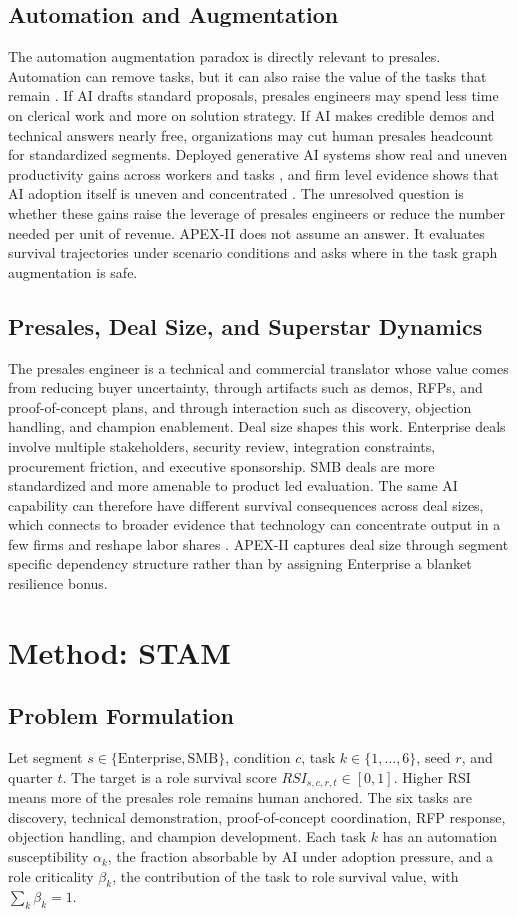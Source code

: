 \documentclass[10pt,conference]{IEEEtran}
\begin{document}
\subsection{Automation and Augmentation}
The automation augmentation paradox is directly relevant to presales. Automation can remove tasks, but it can also raise the value of the tasks that remain \cite{raisch2021artificial}. If AI drafts standard proposals, presales engineers may spend less time on clerical work and more on solution strategy. If AI makes credible demos and technical answers nearly free, organizations may cut human presales headcount for standardized segments. Deployed generative AI systems show real and uneven productivity gains across workers and tasks \cite{brynjolfsson2023generative}, and firm level evidence shows that AI adoption itself is uneven and concentrated \cite{mcelheran2024adoption}. The unresolved question is whether these gains raise the leverage of presales engineers or reduce the number needed per unit of revenue. APEX-II does not assume an answer. It evaluates survival trajectories under scenario conditions and asks where in the task graph augmentation is safe.

\subsection{Presales, Deal Size, and Superstar Dynamics}
The presales engineer is a technical and commercial translator whose value comes from reducing buyer uncertainty, through artifacts such as demos, RFPs, and proof-of-concept plans, and through interaction such as discovery, objection handling, and champion enablement. Deal size shapes this work. Enterprise deals involve multiple stakeholders, security review, integration constraints, procurement friction, and executive sponsorship. SMB deals are more standardized and more amenable to product led evaluation. The same AI capability can therefore have different survival consequences across deal sizes, which connects to broader evidence that technology can concentrate output in a few firms and reshape labor shares \cite{autor2020fall}. APEX-II captures deal size through segment specific dependency structure rather than by assigning Enterprise a blanket resilience bonus.

\section{Method: STAM}
\subsection{Problem Formulation}
Let segment $s \in \{\mathrm{Enterprise}, \mathrm{SMB}\}$, condition $c$, task $k \in \{1,\ldots,6\}$, seed $r$, and quarter $t$. The target is a role survival score $RSI_{s,c,r,t} \in [0,1]$. Higher RSI means more of the presales role remains human anchored. The six tasks are discovery, technical demonstration, proof-of-concept coordination, RFP response, objection handling, and champion development. Each task $k$ has an automation susceptibility $\alpha_k$, the fraction absorbable by AI under adoption pressure, and a role criticality $\beta_k$, the contribution of the task to role survival value, with $\sum_k \beta_k = 1$.
\end{document}
